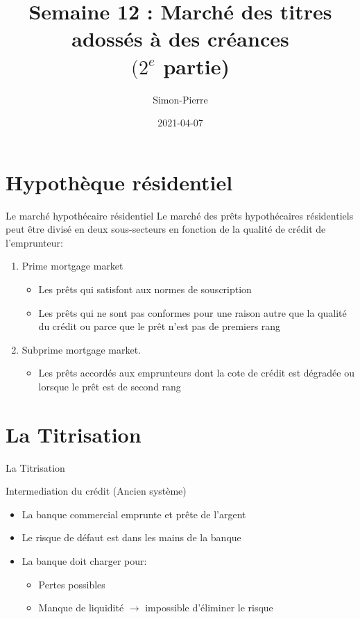\documentclass[10pt,a4paper]{beamer}
\title{Semaine 12 : Marché des titres adossés à des créances \\ $(2^{e}$ partie)}
\date{2021-04-07}
\author{Simon-Pierre}
\institute{Université Laval}
\begin{document}
\begin{frame}
\titlepage
\end{frame}

\begin{frame}
\tableofcontents
\end{frame}

\section{Hypothèque résidentiel}

\begin{frame}{Le marché hypothécaire résidentiel}
Le marché des prêts hypothécaires résidentiels peut être divisé en deux sous-secteurs en fonction de la qualité de crédit de l'emprunteur:
\begin{enumerate}[label=\arabic*)]
\item Prime mortgage market 
\begin{itemize}[label=\bullet]
\item Les prêts qui satisfont aux normes de souscription
\item Les prêts qui ne sont pas conformes pour une raison autre que la qualité du crédit ou parce que le prêt n'est pas de premiers rang
\end{itemize}
\item Subprime mortgage market. 
\begin{itemize}[label=\bullet]
\item Les prêts accordés aux emprunteurs dont la cote de crédit est dégradée ou lorsque le prêt est de second rang
\end{itemize}
\end{enumerate}
\end{frame}

\section{La Titrisation}

\begin{frame}{La Titrisation}
\begin{block}{Intermediation du crédit (Ancien système)}
\begin{itemize}[label=\bullet]
\item La banque commercial emprunte et prête de l’argent
\item Le risque de défaut est dans les mains de la banque
\item La banque doit charger pour:
\begin{itemize}[label=\bullet]
\item Pertes possibles
\item Manque de liquidité $\rightarrow$ impossible d'éliminer le risque
\end{itemize}
\end{itemize}
\end{block}
\end{frame}
\end{document}

